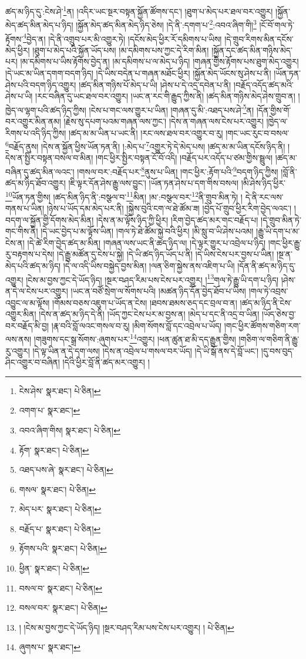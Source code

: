 ཚད་མ་ཉིད་དུ་:ངེས་ཤེ་\footnote{ངེས་ཤེས་  སྣར་ཐང་།  པེ་ཅིན། }ན། །འདིར་ཡང་སྔར་བསྟན་སྐྱོན་ཚོགས་དང་། །ཐུག་པ་མེད་པར་ཐལ་བར་འགྱུར། །སྐྱོན་མེད་ཚད་མིན་མེད་པ་ཉིད། །སྐྱོན་མེད་ཚད་མིན་མེད་ཉིད་ཅེས། །དེ་ནི་:དགག་པ་\footnote{འགག་པ་  སྣར་ཐང་། }:འབའ་ཞིག་གི།\footnote{འབའ་ཞིག་གིས།  སྣར་ཐང་།  པེ་ཅིན། } །ངོ་བོ་གལ་ཏེ་རྟོགས་\footnote{རྟོག་  སྣར་ཐང་།  པེ་ཅིན། }བྱེད་ན། །དེ་ནི་འགྲུབ་པར་མི་འགྱུར་ཏེ། །དངོས་མེད་ཕྱིར་རོ་དམིགས་པ་ཡིས། །དེ་གྲུབ་རིགས་མིན་དངོས་མེད་ཕྱིར། །ཐུག་པ་མེད་པའི་སྐྱོན་ཡོད་པས། །མ་དམིགས་པས་ཀྱང་དེ་རིག་མིན། །སྐྱོན་དང་ཚད་མིན་གཉིས་མེད་པར། །མ་དམིགས་པ་ཡིས་རྟོགས་བྱེད་ན། །མ་དམིགས་པ་ལ་མེད་པ་ཉིད། །གཞན་གྱིས་རྟོགས་པས་ཐུག་མེད་འགྱུར། །དེ་ཡང་མ་ཡིན་དགག་བདག་ཉིད། །དེ་ཡིས་བདེན་པ་གཞན་མཐོང་ཕྱིར། །སྐྱོན་མེད་ཡོངས་སུ་ཤེས་པ་ནི། །ཡོན་ཏན་ཤེས་པའི་བདག་ཉིད་འགྱུར། །ཚད་མིན་གཉིས་པོ་མེད་པ་ཡི། །ཤེས་པ་དེ་འདྲ་དབེན་པ་ནི། །བརྗོད་འདོད་ཚད་མའི་ཤེས་པ་ཡི། །རང་བཞིན་དུ་ཡང་ཐལ་བར་འགྱུར། །ཡང་ན་རང་གི་རྒྱུད་ཀྱིས་ནི། །ཚད་མིན་གཉིས་མེད་ཤེས་གྲུབ་ན། །ཁྱེད་ལ་ལྷག་པའི་ཚད་ཉིད་ཀྱིས། །ངེས་པ་གང་ལས་གྱུར་པ་ཡིན། །གཞན་དུ་མི་:འཐད་པས་ཤེ་\footnote{འཐད་པས་ཞེ་  སྣར་ཐང་།  པེ་ཅིན། }ན། །དོན་གྱིས་གོ་བར་འགྱུར་མིན་ནམ། །རྗེས་སུ་དཔག་པའམ་གཞན་ལས་ཀྱང་། །དེས་ན་གཞན་ལས་ངེས་པར་འགྱུར། །ཁྱེད་ལ་རིགས་པ་འདི་ཉིད་ཀྱིས། །ཚད་མ་མ་ཡིན་པ་ཡང་ནི། །རང་ལས་ཐལ་བར་འགྱུར་བ་རུ། །གང་ཡང་རུང་བ་བསལ་\footnote{གསལ་  སྣར་ཐང་།  པེ་ཅིན། }བརྗོད་ནུས། །དེས་ན་སྐྱོན་ཕྱིས་ཡོན་ཏན་ནི། །:མེད་པ་\footnote{མེད་པར་  སྣར་ཐང་།  པེ་ཅིན། }འགྱུར་ཏེ་དེ་མེད་པས། །ཚད་མ་མ་ཡིན་དངོས་ཉིད་ནི། །དེས་ན་སྤྱིར་བསྟན་བསལ་བ་མིན། །གང་ཕྱིར་སྤྱིར་བསྟན་ངོ་བོ་འདི། །བརྗོད་པར་འདོད་པ་ཙམ་གྱིས་སྦྲུལ། །ཚད་མ་བཞིན་དུ་ཚད་མིན་ལའང་། །གསལ་བར་:བརྗོད་པར་\footnote{བརྗོད་པ་  སྣར་ཐང་།  པེ་ཅིན། }ནུས་པ་ཡིན། །གང་ཕྱིར་:རྟོག་པའི་\footnote{རྟོགས་པའི་  སྣར་ཐང་།  པེ་ཅིན། }བདག་ཉིད་ཀྱིས། །བློ་ནི་ཚད་མ་ཉིད་ཐོབ་འགྱུར། །ཇི་ལྟར་དོན་ཤེས་རྒྱུ་ལས་བྱུང་། །ཡོན་ཏན་ཤེས་པ་དག་གིས་བསལ། །མི་ཤེས་ཉིད་ཕྱིར་\footnote{ཕྱིན་  སྣར་ཐང་།  པེ་ཅིན། }ཡོན་ཏན་གྱིས། །ཚད་མིན་ཉིད་ནི་:བསྩལ་བ་\footnote{བསལ་བ་  སྣར་ཐང་།  པེ་ཅིན། }མིན། །མ་:བསྩལ་བར་\footnote{བསལ་བར་  སྣར་ཐང་།  པེ་ཅིན། }ནི་གྲུབ་མིན་ཏེ། །
དེ་ནི་རང་ལས་གནས་པ་ཡིན། །ཉེས་པ་ཡོད་དམ་མེད་པར་ནི། །སྐྱེས་བུའི་ངག་ལ་ཐེ་ཚོམ་ཟ། །བྱེད་པོ་གྲུབ་ཕྱིར་རིག་བྱེད་ལའང་། །བདག་ལ་སྐྱོན་གྱི་དོགས་མེད་མིན། །དེས་ན་མ་ལྟོས་ཉིད་ཀྱི་ཕྱིར། །རིག་བྱེད་ཚད་མར་གང་བརྗོད་པ། །དེ་གྲུབ་མིན་ཏེ་གང་གིས་ནི། །དེ་ཡང་བྱེད་པ་མ་ལྟོས་ཡིན། །གལ་ཏེ་ཐེ་ཚོམ་སྐྱེ་བའི་ཕྱིར། །མི་སླུ་བ་ཡི་ཤེས་པའམ། །རྒྱུ་ཡི་དག་པ་མ་ངེས་ན། །དེ་ཚེ་རིག་བྱེད་ཚད་མ་མིན། །གཞན་ལས་ཡང་ནི་ཚད་ཉིད་ལ། །དེ་ལྟར་གྱུར་པ་འབྲེལ་པ་ཉིད། །གང་ཕྱིར་རྒྱུ་རུ་བརྟགས་པ་དེས། །དེ་རྒྱུ་མཚོན་དུ་ངེས་པ་སྐྱེ། །དེ་ཡི་ཚད་ཉིད་ཡོད་པ་ནི། །དེ་ཡིས་ངེས་པར་བྱས་པ་ཡིན། །སྔ་ན་མེད་པའི་ཚད་མ་ཉིད། །དེ་ལ་འདི་ཡིས་བསྐྱེད་བྱས་མིན། །ལན་ཅིག་སྐྱེས་ནས་འཇིག་པ་ཡི། །དོན་ནི་ཚད་མ་ཉིད་དུ་འགྱུར། །ངེས་མ་བྱས་ཀྱང་དེ་ཡོད་ཉིད། །སྔར་བཤད་རིམ་པས་ངེས་པར་འགྱུར། །\footnote{། །ངེས་མ་བྱས་ཀྱང་དེ་ཡོད་ཉིད། །སྔར་བཤད་རིམ་པས་ངེས་པར་འགྱུར། །  པེ་ཅིན། }གལ་ཏེ་རྒྱུ་ཡི་དག་པ་ཉིད། །ཤེས་ན་དེ་ལ་ངེས་པར་འགྱུར། །ཡང་ན་བཙོ་སྲེག་ལ་སོགས་པའི། །མཚན་ཉིད་དོན་བྱེད་ཐོབ་པ་ཡིས། །གལ་ཏེ་འབྲས་འབྱུང་ལ་མ་ལྟོས། །གོམས་བཅས་འཇུག་པ་ཡོད་ན་ངེས། །ཐབས་ཐམས་ཅད་དང་བྲལ་བ་ན། །ཚད་མ་ཉིད་ནི་ངེས་འགྱུར་མིན། །དེས་ན་ཚད་མ་ཉིད་དེ་ནི། །ཡོད་ཀྱང་ངེས་པར་མ་བྱས་ན། །མེད་པ་དང་ནི་འདྲ་བ་ཡིན། །ཡོད་ཅེས་བྱ་བར་བརྗོད་མི་བྱ། །རྣ་བའི་བློ་ལའང་གསལ་བ་རུ། །མིག་སོགས་བློ་དང་འབྲེལ་པ་ཡོད། །གང་ཕྱིར་ཚོགས་གཅིག་རག་ལས་ནས། །གཟུགས་དང་སྒྲ་སོགས་:ཞུགས་པར་\footnote{ཞུགས་པ་  སྣར་ཐང་། }འགྱུར། །ཕན་ཚུན་ཐ་མི་དད་རྒྱུན་གྱིས། །གཅིག་ལ་གཅིག་ནི་རྒྱུ་རུ་འགྱུར། །དེ་ལྟ་ཡིན་ན་དེ་དག་ལས། །དེས་ན་འབྲེལ་པ་གསལ་བར་ཡོད། །དེ་ཡི་སྒོ་ནས་དེ་བློ་ཡང་། །དུ་བས་བུད་ཤིང་འགྱུར་བ་བཞིན། །དེའི་ཕྱིར་བློ་ནི་ཚད་མར་འགྱུར། །
